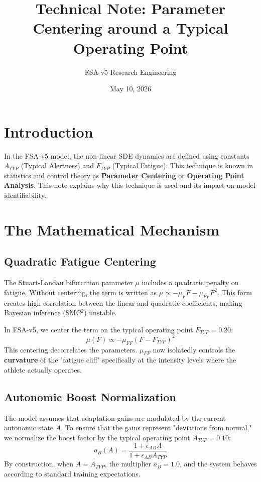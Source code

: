 \documentclass[11pt,a4paper]{article}
\title{Technical Note: Parameter Centering around a Typical Operating Point}
\author{FSA-v5 Research Engineering}
\date{May 10, 2026}
\begin{document}
\maketitle

\section{Introduction}
In the FSA-v5 model, the non-linear SDE dynamics are defined using constants $A_{TYP}$ (Typical Alertness) and $F_{TYP}$ (Typical Fatigue). This technique is known in statistics and control theory as \textbf{Parameter Centering} or \textbf{Operating Point Analysis}. This note explains why this technique is used and its impact on model identifiability.

\section{The Mathematical Mechanism}

\subsection{Quadratic Fatigue Centering}
The Stuart-Landau bifurcation parameter $\mu$ includes a quadratic penalty on fatigue. Without centering, the term is written as $\mu \propto - \mu_F F - \mu_{FF} F^2$. This form creates high correlation between the linear and quadratic coefficients, making Bayesian inference (SMC$^2$) unstable.

In FSA-v5, we center the term on the typical operating point $F_{TYP} = 0.20$:
\begin{equation}
    \mu(F) \propto - \mu_{FF} (F - F_{TYP})^2
\end{equation}
This centering decorrelates the parameters. $\mu_{FF}$ now isolatedly controls the \textbf{curvature} of the "fatigue cliff" specifically at the intensity levels where the athlete actually operates.

\subsection{Autonomic Boost Normalization}
The model assumes that adaptation gains are modulated by the current autonomic state $A$. To ensure that the gains represent "deviations from normal," we normalize the boost factor by the typical operating point $A_{TYP} = 0.10$:
\begin{equation}
    a_{B}(A) = \frac{1 + \epsilon_{AB} A}{1 + \epsilon_{AB} A_{TYP}}
\end{equation}
By construction, when $A = A_{TYP}$, the multiplier $a_B = 1.0$, and the system behaves according to standard training expectations.
\end{document}
